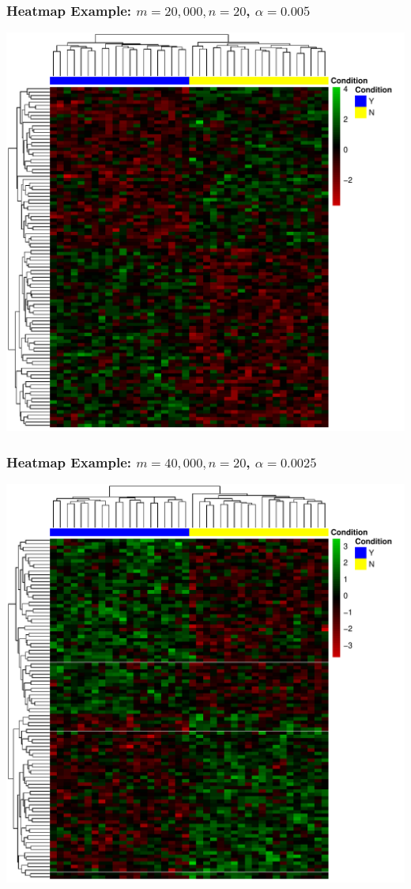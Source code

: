 \documentclass[xcolor=x11names,compress]{beamer}\usepackage[]{graphicx}\usepackage[]{color}
\newenvironment{knitrout}{}{} %
\begin{document}
\begin{frame}[containsverbatim]
  \frametitle{Heatmap Example: $m=20,000, n=20$, $\alpha=0.005$}
\begin{knitrout}\tiny
{}\color{fgcolor}

{\centering \includegraphics[width=.5\linewidth]{figure/beamer-hm1-1} 

}



\end{knitrout}

\end{frame}


\begin{frame}[containsverbatim]
  \frametitle{Heatmap Example: $m=40,000, n=20$, $\alpha=0.0025$}

\begin{knitrout}\tiny
{}\color{fgcolor}

{\centering \includegraphics[width=.5\linewidth]{figure/beamer-hm2-1} 

}



\end{knitrout}
\end{frame}
\end{document}
